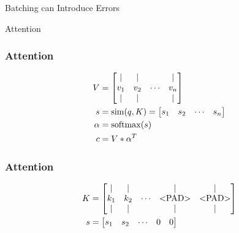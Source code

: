 \documentclass{beamer}
\newcommand{\softmax}{\mathop{\rm softmax}\nolimits}
\newcommand{\similar}{\mathop{\rm sim}\nolimits}
\begin{document}
\begin{section}{Batching can Introduce Errors}
\begin{subsection}{Attention}
        \begin{frame}
            \frametitle{Attention}
            \begin{align*}
                V &= \begin{bmatrix}
                         \vert & \vert & & \vert \\
                         v_1 & v_2 & \cdots & v_n \\
                         \vert & \vert & & \vert
                     \end{bmatrix} \\
                s &= \similar(q, K) = \begin{bmatrix}
                        s_1 & s_2 & \cdots & s_n \\
                    \end{bmatrix} \\
                \alpha &= \softmax(s) \\
                c &= V * \alpha^{T} \\
            \end{align*}
        \end{frame}

        \begin{frame}
            \frametitle{Attention}

            \begin{align*}
                K &= \begin{bmatrix}
                        \vert & \vert & & \vert & \vert \\
                        k_1 & k_2 & \cdots & \text{\textless PAD\textgreater} & \text{\textless PAD\textgreater} \\
                        \vert & \vert & & \vert & \vert \\
                     \end{bmatrix} \\
                s &= \begin{bmatrix}
                        s_1 & s_2 & \cdots & 0 & 0
                     \end{bmatrix}
            \end{align*}


\end{frame}
\end{subsection}
\end{section}
\end{document}
